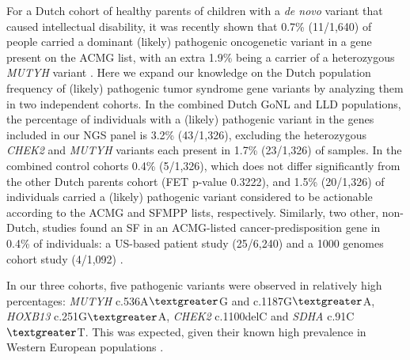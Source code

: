 For a Dutch cohort of healthy parents of children with a \textsl{de novo} variant that caused intellectual disability, it was recently shown that 0.7\% (11/1,640) of people carried a dominant (likely) pathogenic oncogenetic variant in a gene present on the ACMG list, with an extra 1.9\% being a carrier of a heterozygous \textsl{MUTYH} variant \cite{Haer_Wigman_2018}. 
Here we expand our knowledge on the Dutch population frequency of (likely) pathogenic tumor syndrome gene variants by analyzing them in two independent cohorts. 
In the combined Dutch GoNL and LLD populations, the percentage of individuals with a (likely) pathogenic variant in the genes included in our NGS panel is 3.2\% (43/1,326), excluding the heterozygous \textsl{CHEK2} and \textsl{MUTYH} variants each present in 1.7\% (23/1,326) of samples. 
In the combined control cohorts 0.4\% (5/1,326), which does not differ significantly from the other Dutch parents cohort (FET p-value 0.3222), and 1.5\% (20/1,326) of individuals carried a (likely) pathogenic variant considered to be actionable according to the ACMG and SFMPP lists, respectively. Similarly, two other, non-Dutch, studies found an SF in an ACMG-listed cancer-predisposition gene in 0.4\% of individuals: a US-based patient study (25/6,240) \cite{Hart_2018} and a 1000 genomes cohort study (4/1,092) \cite{Olfson_2015}.  

In our three cohorts, five pathogenic variants were observed in relatively high percentages: \textsl{MUTYH} c.536A$\textgreater$G and c.1187G$\textgreater$A, \textsl{HOXB13} c.251G$\textgreater$A, \textsl{CHEK2} c.1100delC and \textsl{SDHA} c.91C$\textgreater$T. 
This was expected, given their known high prevalence in Western European populations \cite{Aretz_2013,Apostolou_2017,Liu_2016b,Oudijk_2012}. 


